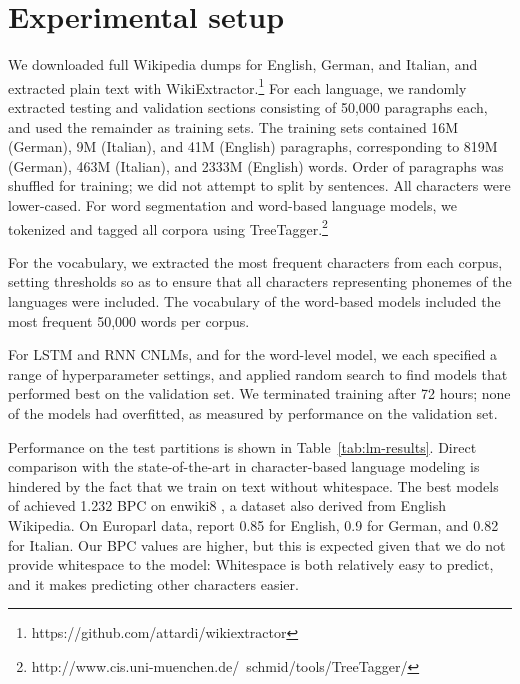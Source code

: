 \section{Experimental setup}
\label{sec:setup}

We downloaded full Wikipedia dumps for English, German, and Italian, and extracted plain text with WikiExtractor.\footnote{https://github.com/attardi/wikiextractor}
For each language, we randomly extracted testing and validation sections consisting of 50,000 paragraphs each, and used the remainder as training sets.
The training sets contained 16M (German), 9M (Italian), and 41M (English) paragraphs, corresponding to 819M (German), 463M (Italian), and 2333M (English) words.
Order of paragraphs was shuffled for training; we did not attempt to split by sentences.
All characters were lower-cased.
For word segmentation and word-based language models, we tokenized and tagged all corpora using TreeTagger.\footnote{http://www.cis.uni-muenchen.de/~schmid/tools/TreeTagger/}

For the vocabulary, we extracted the most frequent characters from each corpus, setting thresholds so as to ensure that all characters representing phonemes of the languages were included.
The vocabulary of the word-based models included the most frequent 50,000 words per corpus.


For LSTM and RNN CNLMs, and for the word-level model, we each specified a range of hyperparameter settings, and applied random search to find models that performed best on the validation set.
We terminated training after 72 hours; none of the models had overfitted, as measured by performance on the validation set.

Performance on the test partitions is shown in Table~\ref{tab:lm-results}.
Direct comparison with the state-of-the-art in character-based language modeling is hindered by the fact that we train on text without whitespace.
The best models of \cite{merity2018analysis} achieved 1.232 BPC on enwiki8 \cite{hutter2018}, a dataset also derived from English Wikipedia. %
On Europarl data, \cite{cotterell2018all} report 0.85 for English, 0.9 for German, and 0.82 for Italian.
Our BPC values are higher, but this is expected given that we do not provide whitespace to the model: Whitespace is both relatively easy to predict, and it makes predicting other characters easier.

